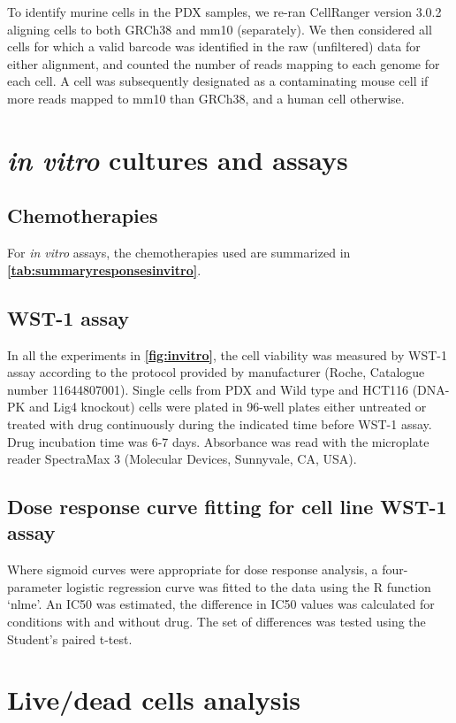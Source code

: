 To identify murine cells in the PDX samples, we re-ran CellRanger version 3.0.2 aligning cells to both GRCh38 and mm10 (separately). We then considered all cells for which a valid barcode was identified in the raw (unfiltered) data for either alignment, and counted the number of reads mapping to each genome for each cell. A cell was subsequently designated as a contaminating mouse cell if more reads mapped to mm10 than GRCh38, and a human cell otherwise.

\section{\textit{in vitro} cultures and assays}

\subsection{Chemotherapies}
For \textit{in vitro} assays, the chemotherapies used are summarized in \textbf{\autoref{tab:summaryresponsesinvitro}}.


\subsection{WST-1 assay}
In all the experiments in \textbf{\autoref{fig:invitro}}, the cell viability was measured by WST-1 assay according to the protocol provided by manufacturer (Roche, Catalogue number 11644807001). Single cells from PDX and Wild type and HCT116 (DNA-PK and Lig4 knockout) cells were plated in 96-well plates either untreated or treated with drug continuously during the indicated time before WST-1 assay. Drug incubation time was 6-7 days. Absorbance was read with the microplate reader SpectraMax 3 (Molecular Devices, Sunnyvale, CA, USA).

\subsection{Dose response curve fitting for cell line WST-1 assay}
Where sigmoid curves were appropriate for dose response analysis, a four-parameter logistic regression curve was fitted to the data using the R function ‘nlme’. An IC50 was estimated, the difference in IC50 values was calculated for conditions with and without drug. The set of differences was tested using the Student's paired t-test.

\section{Live/dead cells analysis}

